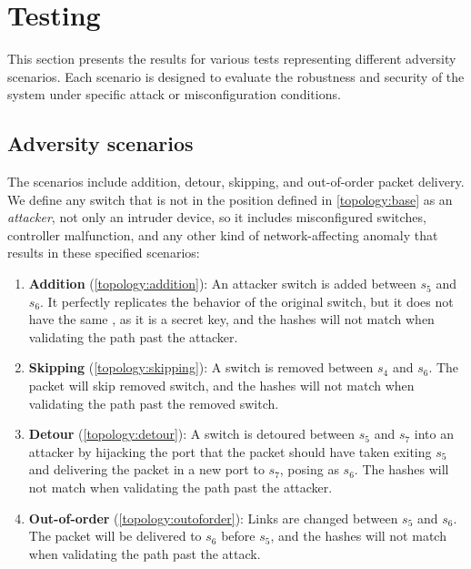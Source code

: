 \section{Testing} \label{sec:testing}

This section presents the results for various tests representing different adversity scenarios. Each scenario is designed to evaluate the robustness and security of the system under specific attack or misconfiguration conditions. 

\subsection{Adversity scenarios}\label{sec:adversity_scenarios}

The scenarios include addition, detour, skipping, and out-of-order packet delivery. We define any switch that is not in the position defined in \autoref{topology:base} as an \textit{attacker}, not only an intruder device, so it includes misconfigured switches, controller malfunction, and any other kind of network-affecting anomaly that results in these specified scenarios:

\begin{enumerate}[label=\roman*.]
    \item \label{scenario:addition} \textbf{Addition} (\autoref{topology:addition}): An attacker switch is added between $s_5$ and $s_6$. It perfectly replicates the behavior of the original switch, but it does not have the same \nodeid, as it is a secret key, and the hashes will not match when validating the path past the attacker.
    \item \label{scenario:skipping} \textbf{Skipping} (\autoref{topology:skipping}): A switch is removed between $s_4$ and $s_6$. The packet will skip removed switch, and the hashes will not match when validating the path past the removed switch.
    \item \label{scenario:detour} \textbf{Detour} (\autoref{topology:detour}): A switch is detoured between $s_5$ and $s_7$ into an attacker by hijacking the port that the packet should have taken exiting $s_5$ and delivering the packet in a new port to $s_7$, posing as $s_6$. The hashes will not match when validating the path past the attacker.
    \item \label{scenario:outoforder} \textbf{Out-of-order} (\autoref{topology:outoforder}): Links are changed between $s_5$ and $s_6$. The packet will be delivered to $s_6$ before $s_5$, and the hashes will not match when validating the path past the attack.
\end{enumerate}


